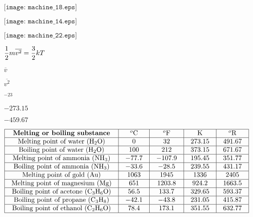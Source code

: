 \documentclass[12pt,a4paper,margin=2cm]{book}
\def\lthtmlcheckvsize{\ifdim\ht\sizebox<\vsize 
  \ifdim\wd\sizebox<\hsize\expandafter\hfill\fi \expandafter\vfill
  \else\expandafter\vss\fi}%
\begin{document}
{\newpage\clearpage
{}%
$\displaystyle \texttt{[image: machine\_18.eps]}$%
\lthtmlindisplaymathZ
\lthtmlcheckvsize\clearpage}

{\newpage\clearpage
{}%
$\displaystyle \texttt{[image: machine\_14.eps]}$%
\lthtmlindisplaymathZ
\lthtmlcheckvsize\clearpage}

{\newpage\clearpage
{}%
$\displaystyle \texttt{[image: machine\_22.eps]}$%
\lthtmlindisplaymathZ
\lthtmlcheckvsize\clearpage}

{\newpage\clearpage
{}%
$\displaystyle {1 \over 2}m\overline{v^2} = {3 \over 2}kT$%
\lthtmlindisplaymathZ
\lthtmlcheckvsize\clearpage}

{\newpage\clearpage
{}%
$ \overline{v}$%
\lthtmlindisplaymathZ
\lthtmlcheckvsize\clearpage}

{\newpage\clearpage
{}%
$ \overline{v^2}$%
\lthtmlindisplaymathZ
\lthtmlcheckvsize\clearpage}

{\newpage\clearpage
{}%
$ ^{-23}$%
\lthtmlindisplaymathZ
\lthtmlcheckvsize\clearpage}

{\newpage\clearpage
{}%
$ -273.15$%
\lthtmlindisplaymathZ
\lthtmlcheckvsize\clearpage}

{\newpage\clearpage
{}%
$ -459.67$%
\lthtmlindisplaymathZ
\lthtmlcheckvsize\clearpage}

{\newpage\clearpage
{}%
$\displaystyle \vbox{\offinterlineskip
\halign{\strut
\vrule \quad\hfil # \  \hfil & 
\vrule \quad\hfil # \  \hfil & 
\vrule \quad\hfil # \  \hfil & 
\vrule \quad\hfil # \  \hfil & 
\vrule \quad\hfil # \  \hfil \vrule \cr
\noalign{\hrule }
\textbf{Melting or boiling substance} & $^{o}$C & $^{o}$F & K & $^{o}$R \cr
\noalign{\hrule }
Melting point of water (H$_{2}$O) & 0 & 32 & 273.15 & 491.67 \cr
\noalign{\hrule }
Boiling point of water (H$_{2}$O) & 100 & 212 & 373.15 & 671.67 \cr
\noalign{\hrule }
Melting point of ammonia (NH$_{3}$) & $-77.7$ & $-107.9$ & 195.45 & 351.77 \cr
\noalign{\hrule }
Boiling point of ammonia (NH$_{3}$) & $-33.6$ & $-28.5$ & 239.55 & 431.17 \cr
\noalign{\hrule }
Melting point of gold (Au) & 1063 & 1945 & 1336 & 2405 \cr
\noalign{\hrule }
Melting point of magnesium (Mg) & 651 & 1203.8 & 924.2 & 1663.5 \cr
\noalign{\hrule }
Boiling point of acetone (C$_{3}$H$_{6}$O) & 56.5 & 133.7 & 329.65 & 593.37 \cr
\noalign{\hrule }
Boiling point of propane (C$_{3}$H$_{8}$) & $-42.1$ & $-43.8$ & 231.05 & 415.87 \cr
\noalign{\hrule }
Boiling point of ethanol (C$_{2}$H$_{6}$O) & 78.4 & 173.1 & 351.55 & 632.77 \cr
\noalign{\hrule }
} %
}$%
\lthtmlindisplaymathZ
\lthtmlcheckvsize\clearpage}
\end{document}
